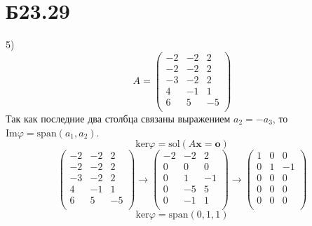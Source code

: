 \documentclass[a4paper,12pt]{article} %
\begin{document}
\section*{Б23.29}5)
$$A=\begin{pmatrix*}
    -2&-2&2\\
    -2&-2&2\\
    -3&-2&2\\
    4&-1&1\\
    6&5&-5\\
\end{pmatrix*}$$
Так как последние два столбца связаны выражением $a_2=-a_3$, то $\mathrm{Im}\varphi=\mathrm{span}(a_1,a_2)$.
$$\mathrm{ker}\varphi=\mathrm{sol}(A\textbf{x}=\textbf{o})$$
$$\begin{pmatrix*}
    -2&-2&2\\
    -2&-2&2\\
    -3&-2&2\\
    4&-1&1\\
    6&5&-5\\
\end{pmatrix*}\rightarrow\begin{pmatrix*}
    -2&-2&2\\
    0&0&0\\
    0&1&-1\\
    0&-5&5\\
    0&-1&1\\
\end{pmatrix*}\rightarrow\begin{pmatrix*}
    1&0&0\\
    0&1&-1\\
    0&0&0\\
    0&0&0\\
    0&0&0\\
\end{pmatrix*}$$
$$\mathrm{ker}\varphi=\mathrm{span}(0,1,1)$$
\end{document}
